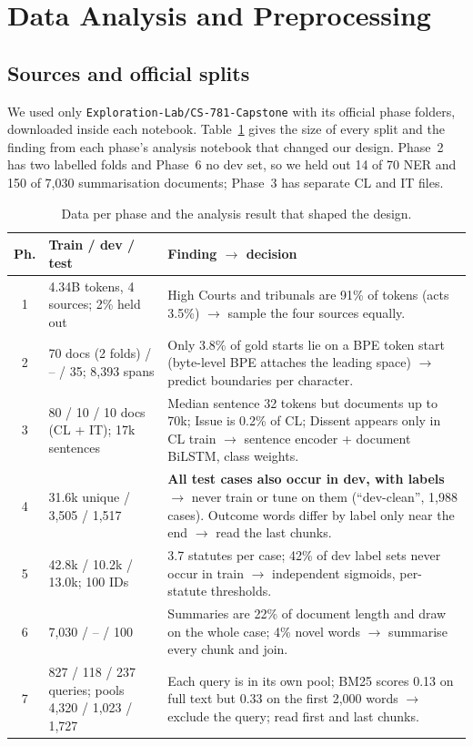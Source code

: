 \documentclass[11pt, oneside]{article}
\begin{document}
\section{Data Analysis and Preprocessing}
\subsection{Sources and official splits}
We used only \texttt{Exploration-Lab/CS-781-Capstone} with its official phase folders, downloaded inside each notebook. Table~\ref{tab:data} gives the size of every split and the finding from each phase's analysis notebook that changed our design. Phase~2 has two labelled folds and Phase~6 no dev set, so we held out 14 of 70 NER and 150 of 7,030 summarisation documents; Phase~3 has separate CL and IT files.

\begin{table}[t]
\centering\footnotesize\setlength{\tabcolsep}{4pt}
\caption{Data per phase and the analysis result that shaped the design.}\label{tab:data}
\begin{tabularx}{\textwidth}{@{}c p{3.5cm} X@{}}\toprule
Ph. & Train / dev / test & Finding $\rightarrow$ decision \\\midrule
1 & 4.34B tokens, 4 sources; 2\% held out & High Courts and tribunals are 91\% of tokens (acts 3.5\%) $\rightarrow$ sample the four sources equally. \\
2 & 70 docs (2 folds) / -- / 35; 8,393 spans & Only 3.8\% of gold starts lie on a BPE token start (byte-level BPE attaches the leading space) $\rightarrow$ predict boundaries per character. \\
3 & 80 / 10 / 10 docs (CL + IT); 17k sentences & Median sentence 32 tokens but documents up to 70k; Issue is 0.2\% of CL; Dissent appears only in CL train $\rightarrow$ sentence encoder + document BiLSTM, class weights. \\
4 & 31.6k unique / 3,505 / 1,517 & \textbf{All test cases also occur in dev, with labels} $\rightarrow$ never train or tune on them (``dev-clean'', 1,988 cases). Outcome words differ by label only near the end $\rightarrow$ read the last chunks. \\
5 & 42.8k / 10.2k / 13.0k; 100 IDs & 3.7 statutes per case; 42\% of dev label sets never occur in train $\rightarrow$ independent sigmoids, per-statute thresholds. \\
6 & 7,030 / -- / 100 & Summaries are 22\% of document length and draw on the whole case; 4\% novel words $\rightarrow$ summarise every chunk and join. \\
7 & 827 / 118 / 237 queries; pools 4,320 / 1,023 / 1,727 & Each query is in its own pool; BM25 scores 0.13 on full text but 0.33 on the first 2,000 words $\rightarrow$ exclude the query; read first and last chunks. \\\bottomrule
\end{tabularx}
\end{table}
\end{document}
